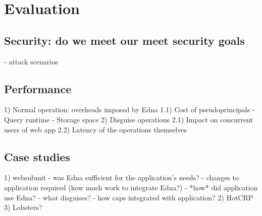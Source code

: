 \section{Evaluation}

\subsection{Security: do we meet our meet security goals}
   - attack scenarios

\subsection{Performance}
   1) Normal operation: overheads imposed by Edna
    1.1) Cost of pseudoprincipals
         - Query runtime
         - Storage space
   2) Disguise operations
    2.1) Impact on concurrent users of web app
    2.2) Latency of the operations themselves

\subsection{Case studies}
   1) websubmit
      - was Edna sufficient for the application's needs?
      - changes to application required (how much work to integrate Edna?)
      - *how* did application use Edna?
        - what disguises?
        - how caps integrated with application?
   2) HotCRP
   3) Lobsters?

   \iffalse
\begin{figure*}[t!]
    \centering
    \texttt{[image: figs/results\_20lec]}
    \caption{20 lectures, 4 questions/lecture: Results of performing disguise actions with varying numbers of users.}
\end{figure*}

\begin{figure*}[t!]
    \centering
    \texttt{[image: figs/results\_40lec]}
    \caption{40 lectures, 4 questions/lecture: Results of performing disguise actions with varying numbers of users.}
\end{figure*}
\fi
